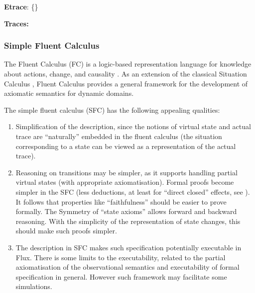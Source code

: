 {\bf Etrace}:  \{\} 

\vspace{4mm}
{\bf Traces:}
\ \ 
\newline 


\newline 



\subsubsection{Simple Fluent Calculus}\label{sec:simplefluentcalculus}
\label{FC}


The Fluent Calculus (FC) is a logic-based representation language
for knowledge about actions, change, and causality \cite{thielscher1999situation}. As an
extension of the classical Situation Calculus \cite{reiter1991frame}, Fluent
Calculus provides a general framework for the development of axiomatic semantics
for dynamic domains.

\vspace{1mm}
The simple fluent calculus (SFC) has the following appealing qualities:
\begin{enumerate} [-]
\item Simplification of the description, since the notions of virtual state and actual trace are ``naturally'' embedded in the fluent calculus (the situation corresponding to a state can be viewed as a representation of the actual trace).

\item Reasoning on transitions may be simpler, as it supports handling partial virtual states (with appropriate axiomatisation). Formal proofs become simpler in the SFC  (less deductions, at least for ``direct closed'' effects, see \cite{thielscher1999situation,framepb03}). It follows that properties like ``faithfulness'' \cite{deransart2007observational} should be easier to prove formally. The Symmetry of ``state axioms'' allows forward and backward reasoning. With the simplicity of the representation of state changes, this should make such proofs simpler.

\item The description in SFC makes such specification potentially executable in Flux. There is some limits to the executability, related to the partial axiomatisation of the observational semantics and executability of formal specification in general. However such framework may facilitate some simulations.

\end{enumerate}

